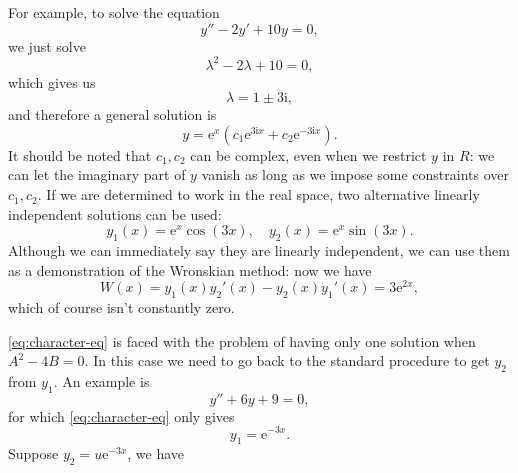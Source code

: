 \documentclass[hyperref, a4paper]{article}
\newcommand*{\ii}{\mathrm{i}}
\newcommand*{\ee}{\mathrm{e}}
\def\mathbb#1{#1}%
\begin{document}
For example, to solve the equation 
\begin{equation}
    y'' - 2 y' + 10 y = 0,
\end{equation}
we just solve 
\[
    \lambda^2 - 2 \lambda + 10 = 0,
\]
which gives us 
\begin{equation}
    \lambda = 1 \pm 3 \ii,
\end{equation}
and therefore a general solution is 
\begin{equation}
    y = \ee^{x} (c_1 \ee^{3 \ii x} + c_2 \ee^{- 3 \ii x}).
\end{equation}
It should be noted that $c_1, c_2$ can be complex,
even when we restrict $y$ in $\mathbb{R}$:
we can let the imaginary part of $y$ vanish 
as long as we impose some constraints over $c_1, c_2$.
If we are determined to work in the real space, 
two alternative linearly independent solutions can be used:
\begin{equation}
    y_1(x) = \ee^{x} \cos(3x), \quad 
    y_2(x) = \ee^{x} \sin(3x).
\end{equation}
Although we can immediately say 
they are linearly independent,
we can use them as a demonstration of the 
Wronskian method: 
now we have 
\begin{equation}
    W(x) = y_1(x) y_2'(x) - y_2(x) y_1'(x) = 3 \ee^{2x},
\end{equation}
which of course isn't constantly zero.

\eqref{eq:character-eq} is faced with the problem 
of having only one solution 
when $A^2 - 4B = 0$.
In this case we need to go back to the standard procedure 
to get $y_2$ from $y_1$.
An example is 
\begin{equation}
    y'' + 6y + 9 = 0,
\end{equation}
for which \eqref{eq:character-eq} only gives 
\begin{equation}
    y_1 = \ee^{-3x}.
\end{equation}
Suppose $y_2 = u \ee^{-3x}$, we have 
\end{document}
